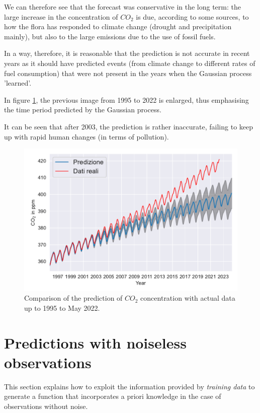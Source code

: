 \newpage

We can therefore see that the forecast was conservative in the long term: the large increase in the concentration of $CO_2$ is due, according to some sources, to how the flora has responded to climate change (drought and precipitation mainly), but also to the large emissions due to the use of fossil fuels.

In a way, therefore, it is reasonable that the prediction is not accurate in recent years as it should have predicted events (from climate change to different rates of fuel consumption) that were not present in the years when the Gaussian process 'learned'.

In figure \ref{CO2_comparison_zoomed}, the previous image from 1995 to 2022 is enlarged, thus emphasising the time period predicted by the Gaussian process.

It can be seen that after 2003, the prediction is rather inaccurate, failing to keep up with rapid human changes (in terms of pollution).  

\begin{figure}[h]
    \centering
    \includegraphics[width=1\textwidth]{images/Gaussian process/MaunaLoaPredictionZoom.pdf}
    \caption{Comparison of the prediction of $CO_2$ concentration with actual data up to 1995 to May 2022.}
    \label{CO2_comparison_zoomed}
\end{figure}




\newpage



\section{Predictions with noiseless observations}\label{regressioneGP}
This section explains how to exploit the information provided by \textit{training data} to generate a function that incorporates a priori knowledge in the case of observations without noise. \\


